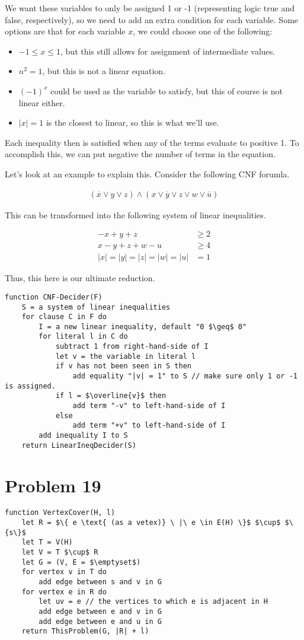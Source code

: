 \documentclass{article}
\providecommand{\prob}[1]{\section*{Problem #1}}
\begin{document}
We want these variables to only be assigned 1 or -1 (representing logic true and false, respectively), so we need to add an extra condition for each variable.
Some options are that for each variable $x$, we could choose one of the following:
\begin{itemize}
  \item $-1 \leq x \leq 1$, but this still allows for assignment of intermediate values.
  \item $n^2 = 1$, but this is not a linear equation.
  \item $(-1)^x$ could be used as the variable to satisfy, but this of course is not linear either.
  \item $|x| = 1$ is the closest to linear, so this is what we'll use.
\end{itemize}

Each inequality then is satisfied when any of the terms evaluate to positive 1.
To accomplish this, we can put negative the number of terms in the equation.

Let's look at an example to explain this.
Consider the following CNF forumla.

\begin{align*}
    (\overline{x} \lor y \lor z) \land (x \lor \overline{y} \lor z \lor w \lor \overline{u})
\end{align*}

This can be transformed into the following system of linear inequalities.

\begin{align*}
    -x + y + z &\geq 2\\
    x - y + z + w -u &\geq 4\\
    |x| = |y| = |z| = |w| = |u| &= 1
\end{align*}

Thus, this here is our ultimate reduction.

\begin{lstlisting}
function CNF-Decider(F)
    S = a system of linear inequalities
    for clause C in F do
        I = a new linear inequality, default "0 $\geq$ 0"
        for literal l in C do
            subtract 1 from right-hand-side of I
            let v = the variable in literal l
            if v has not been seen in S then
                add equality "|v| = 1" to S // make sure only 1 or -1 is assigned.
            if l = $\overline{v}$ then
                add term "-v" to left-hand-side of I
            else
                add term "+v" to left-hand-side of I
        add inequality I to S
    return LinearIneqDecider(S)
\end{lstlisting}

\pagebreak
\prob{19}

\begin{lstlisting}
function VertexCover(H, l)
    let R = $\{ e \text{ (as a vetex)} \ |\ e \in E(H) \}$ $\cup$ $\{s\}$
    let T = V(H)
    let V = T $\cup$ R
    let G = (V, E = $\emptyset$)
    for vertex v in T do
        add edge between s and v in G
    for vertex e in R do
        let uv = e // the vertices to which e is adjacent in H
        add edge between e and v in G
        add edge between e and u in G
    return ThisProblem(G, |R| + l)
\end{lstlisting}
\end{document}
